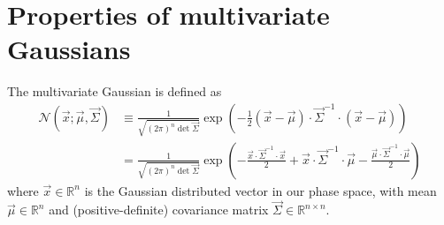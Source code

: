 \documentclass[11pt,twoside]{report}
\begin{document}
\section{Properties of multivariate Gaussians}

The multivariate Gaussian is defined as
\begin{equation}
  \begin{split}
    \mathcal{N}(\vec{x}; \vec{\mu}, \vec{\Sigma})
    &\equiv
    \frac{1}{\sqrt{ (2\pi)^n \det{\vec{\Sigma}} }}
    \exp{\left(
      - \frac{1}{2} (\vec{x} - \vec{\mu}) \cdot \vec{\Sigma}^{-1} \cdot (\vec{x} - \vec{\mu})
      \right)}
    \\
    &=
    \frac{1}{\sqrt{ (2\pi)^n \det{\vec{\Sigma}} }}
    \exp{\left(
      - \frac{\vec{x} \cdot \vec{\Sigma}^{-1} \cdot \vec{x}}{2}
      + \vec{x} \cdot \vec{\Sigma}^{-1} \cdot \vec{\mu}
      - \frac{\vec{\mu} \cdot \vec{\Sigma}^{-1} \cdot \vec{\mu}}{2}
      \right)}
  \end{split}
\end{equation}
where $\vec{x} \in \mathbb{R}^n$ is the Gaussian distributed vector in our phase space, with mean $\vec{\mu} \in \mathbb{R}^n$ and (positive-definite) covariance matrix $\vec{\Sigma} \in \mathbb{R}^{n \times n}$.
\end{document}

